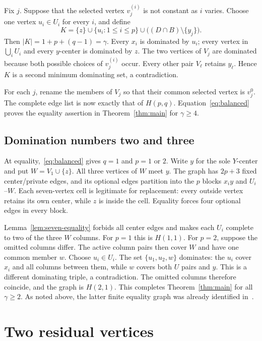 \documentclass[11pt]{article}
\theoremstyle{definition}
\theoremstyle{remark}
\begin{document}
Fix $j$. Suppose that the selected vertex $v_j^{(i)}$ is not constant as
$i$ varies. Choose one vertex $u_i\in U_i$ for every $i$, and define
\[
 K=\{z\}\cup\{u_i:1\le i\le p\}
       \cup\bigl((D\cap B)\setminus\{y_j\}\bigr).
\]
Then $|K|=1+p+(q-1)=\gamma$. Every $x_i$ is dominated by $u_i$;
every vertex in $\bigcup_iU_i$ and every $y$-center is dominated by $z$.
The two vertices of $V_j$ are dominated because both possible choices of
$v_j^{(i)}$ occur. Every other pair $V_\ell$ retains $y_\ell$.
Hence $K$ is a second minimum dominating set, a contradiction.

For each $j$, rename the members of $V_j$ so that their common selected
vertex is $v_j^0$. The complete edge list is now exactly that of $H(p,q)$.
Equation~\eqref{eq:balanced} proves the equality assertion in
Theorem~\ref{thm:main} for $\gamma\ge4$.

\subsection{Domination numbers two and three}

At equality,~\eqref{eq:balanced} gives $q=1$ and $p=1$ or $2$.
Write $y$ for the sole $Y$-center and put $W=V_1\cup\{z\}$. All three
vertices of $W$ meet $y$. The graph has $2p+3$ fixed center/private edges,
and its optional edges partition into the $p$ blocks $x_i y$ and $U_i$--$W$.
Each seven-vertex cell is legitimate for replacement: every outside vertex
retains its own center, while $z$ is inside the cell. Equality forces four
optional edges in every block.

Lemma~\ref{lem:seven-equality} forbids all center edges and makes each $U_i$
complete to two of the three $W$ columns. For $p=1$ this is $H(1,1)$.
For $p=2$, suppose the omitted columns differ. The active column pairs
then cover $W$ and have one common member $w$. Choose $u_i\in U_i$.
The set $\{u_1,u_2,w\}$ dominates: the $u_i$ cover $x_i$ and all columns
between them, while $w$ covers both $U$ pairs and $y$. This is a different
dominating triple, a contradiction. The omitted columns therefore coincide,
and the graph is $H(2,1)$. This completes Theorem~\ref{thm:main} for all
$\gamma\ge2$. As noted above, the latter finite equality graph was already
identified in~\cite{KN}.

\section{Two residual vertices}\label{sec:two}
\end{document}
